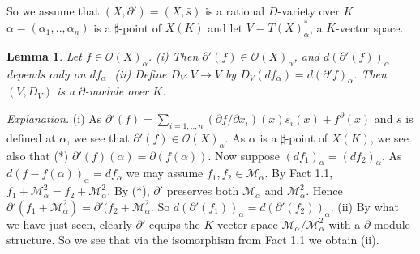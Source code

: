 \documentclass[12pt]{article}
\newtheorem{Lemma}[Theorem]{Lemma}
\begin{document}
So we assume that $(X, \partial ') = (X, {\bar s})$ is  a rational $D$-variety over $K$ 
$\alpha = (\alpha_{1},..,\alpha_{n})$ is a $\sharp$-point of $X(K)$ and let $V = T(X)_{\alpha}^{*}$, a $K$-vector space. 
\begin{Lemma} Let $f\in {\mathcal O}(X)_{\alpha}$. 
\newline
(i) Then ${\partial} '(f)\in {\mathcal O}(X)_{\alpha}$, and $d({\partial '}(f))_{\alpha}$ depends only on $df_{\alpha}$.
\newline
(ii) Define $D_{V}:V\to V$ by $D_{V}(df_{\alpha}) = d(\partial ' f)_{\alpha}$. Then $(V,D_{V})$ is a $\partial$-module over $K$. 
\end{Lemma}
\noindent
{\em Explanation.}    (i) As   $\partial '(f) = \sum_{i=1,..,n}(\partial f/\partial x_{i})({\bar x})s_{i}({\bar x}) + f^{\partial}({\bar x})$ and ${\bar s}$ is defined at $\alpha$,  we see that $\partial ' (f) \in {\mathcal O}(X)_{\alpha}$.  As $\alpha$ is a $\sharp$-point of $X(K)$, we see also that 
\newline
(*) $\partial ' (f)(\alpha) =  \partial (f(\alpha))$.  
\newline
Now suppose $(df_{1})_{\alpha} = (df_{2})_{\alpha}$.  As  $d(f-f({\alpha}))_{\alpha} = df_{\alpha}$ we may assume $f_{1}, f_{2}\in {\mathcal M}_{\alpha}$. 
By Fact 1.1, $f_{1} + {\mathcal M}_{\alpha}^{2} = f_{2} + {\mathcal M}_{\alpha}^{2}$.    
By (*), $\partial '$ preserves both ${\mathcal M}_{\alpha}$ and ${\mathcal M}_{\alpha}^{2}$. 
Hence $\partial '(f_{1} + {\mathcal M}_{\alpha}^{2}) = \partial '(f_{2} + {\mathcal M}_{\alpha}^{2}$. So $d(\partial ' (f_{1}))_{\alpha} = d(\partial '(f_{2}))_{\alpha}$. 
\newline
(ii) By what we have just seen, clearly $\partial '$  equips the $K$-vector space ${\mathcal M}_{\alpha}/{\mathcal M}_{\alpha}^{2}$ with a  $\partial$-module structure.   So we see that via the isomorphism from Fact 1.1 we obtain (ii). 




\end{document}
